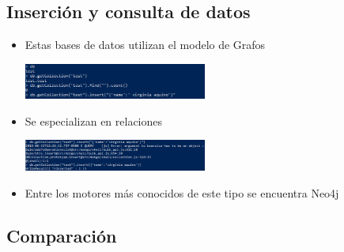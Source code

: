 \documentclass[%
 reprint,
 amsmath,amssymb,
 aps,
]{revtex4-1}
\begin{document}
\subsection{Inserción y consulta de datos}
                     \begin{itemize}
		\item Estas bases de datos utilizan el modelo de Grafos
                      \begin{center}
		\includegraphics[width=6cm]{./Imagenes/26}
		\end{center}	
		\item Se especializan en relaciones
                     \begin{center}
		\includegraphics[width=6cm]{./Imagenes/27}
		\end{center}	
                     \item Entre los motores más conocidos de este tipo se encuentra Neo4j
	          \end{itemize}
\subsection{Comparación}
\end{document}
